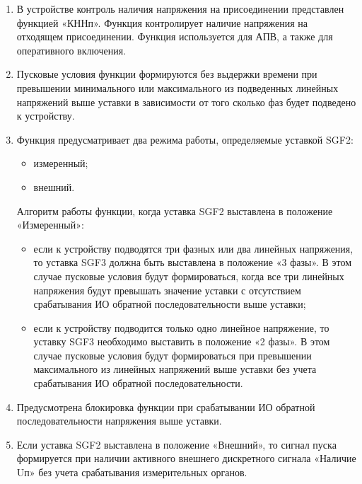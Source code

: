
\color{black}

\begin{enumerate}

\item
В устройстве контроль наличия напряжения на присоединении представлен функцией «КННп». Функция контролирует наличие напряжения на отходящем присоединении. Функция используется для АПВ, а также для оперативного включения.

\item
Пусковые условия функции формируются без выдержки времени при превышении минимального или максимального из подведенных линейных напряжений выше уставки в зависимости от того сколько фаз будет подведено к устройству.

\item
Функция предусматривает два режима работы, определяемые уставкой SGF2:
\begin{itemize}
    \item измеренный;
    \item внешний.
\end{itemize}

Алгоритм работы функции, когда уставка SGF2 выставлена в положение «Измеренный»:
\begin{itemize}
    \item если к устройству подводятся три фазных или два линейных напряжения, то уставка SGF3 должна быть выставлена в положение «3 фазы». В этом случае пусковые условия будут формироваться, когда все три линейных напряжения будут превышать значение уставки с отсутствием срабатывания ИО обратной последовательности выше уставки;
    \item если к устройству подводится только одно линейное напряжение, то уставку SGF3 необходимо выставить в положение «2 фазы». В этом случае пусковые условия будут формироваться при превышении максимального из линейных напряжений выше уставки без учета срабатывания ИО обратной последовательности.
\end{itemize}

\item
Предусмотрена блокировка функции при срабатывании ИО обратной последовательности напряжения выше уставки.

\item
Если уставка SGF2 выставлена в положение «Внешний», то сигнал пуска формируется при наличии активного внешнего дискретного сигнала «Наличие Uп» без учета срабатывания измерительных органов.


\end{enumerate}
